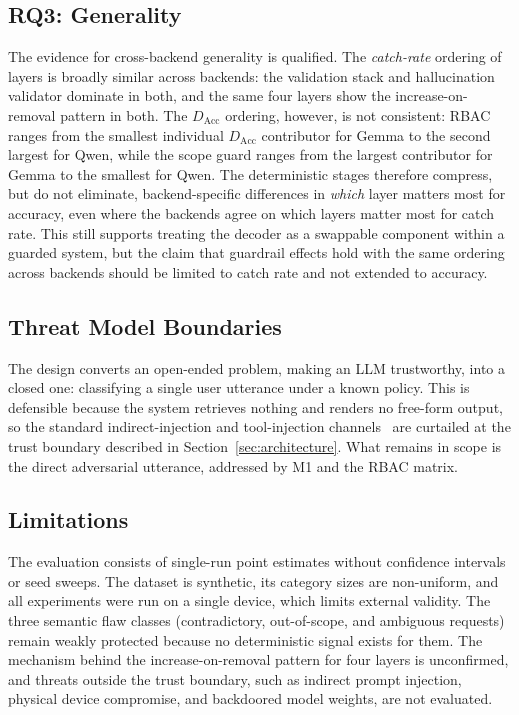 \documentclass[a4paper,twoside]{article}
\begin{document}
\subsection{RQ3: Generality}

\noindent The evidence for cross-backend generality is qualified. The \emph{catch-rate} ordering of layers is broadly similar across backends: the validation stack and hallucination validator dominate in both, and the same four layers show the increase-on-removal pattern in both. The $D_{\mathrm{Acc}}$ ordering, however, is not consistent: RBAC ranges from the smallest individual $D_{\mathrm{Acc}}$ contributor for Gemma to the second largest for Qwen, while the scope guard ranges from the largest contributor for Gemma to the smallest for Qwen. The deterministic stages therefore compress, but do not eliminate, backend-specific differences in \emph{which} layer matters most for accuracy, even where the backends agree on which layers matter most for catch rate. This still supports treating the decoder as a swappable component within a guarded system, but the claim that guardrail effects hold with the same ordering across backends should be limited to catch rate and not extended to accuracy.

\subsection{Threat Model Boundaries}

\noindent The design converts an open-ended problem, making an LLM trustworthy, into a closed one: classifying a single user utterance under a known policy. This is defensible because the system retrieves nothing and renders no free-form output, so the standard indirect-injection and tool-injection channels~\cite{Greshake23,OWASP25} are curtailed at the trust boundary described in Section~\ref{sec:architecture}. What remains in scope is the direct adversarial utterance, addressed by M1 and the RBAC matrix.

\subsection{Limitations}

\noindent The evaluation consists of single-run point estimates without confidence intervals or seed sweeps. The dataset is synthetic, its category sizes are non-uniform, and all experiments were run on a single device, which limits external validity. The three semantic flaw classes (contradictory, out-of-scope, and ambiguous requests) remain weakly protected because no deterministic signal exists for them. The mechanism behind the increase-on-removal pattern for four layers is unconfirmed, and threats outside the trust boundary, such as indirect prompt injection, physical device compromise, and backdoored model weights, are not evaluated.
\end{document}
